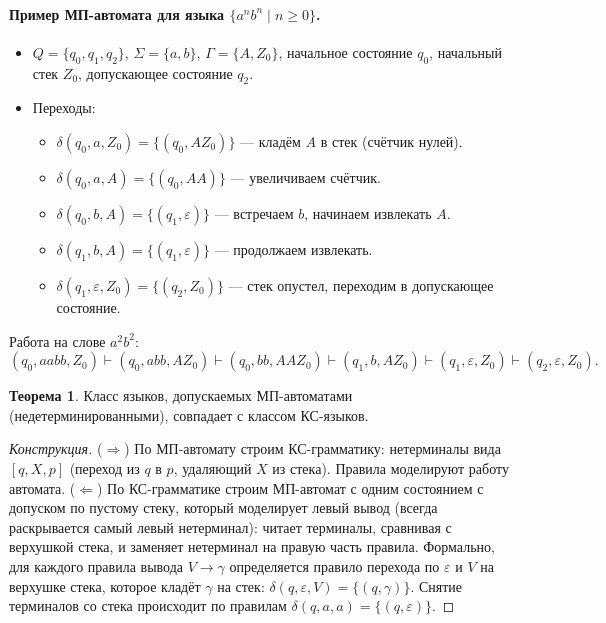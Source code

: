 \documentclass[12pt,a4paper]{article}
\theoremstyle{definition}
\newtheorem{theorem}{Теорема}[section]
\begin{document}
\paragraph{Пример МП-автомата для языка $\{a^n b^n \mid n \ge 0\}$.}
\begin{itemize}
\item $Q = \{q_0, q_1, q_2\}$, $\Sigma = \{a,b\}$, $\Gamma = \{A, Z_0\}$, начальное состояние $q_0$, начальный стек $Z_0$, допускающее состояние $q_2$.
\item Переходы:
  \begin{itemize}
  \item $\delta(q_0, a, Z_0) = \{(q_0, A Z_0)\}$ — кладём $A$ в стек (счётчик нулей).
  \item $\delta(q_0, a, A) = \{(q_0, A A)\}$ — увеличиваем счётчик.
  \item $\delta(q_0, b, A) = \{(q_1, \varepsilon)\}$ — встречаем $b$, начинаем извлекать $A$.
  \item $\delta(q_1, b, A) = \{(q_1, \varepsilon)\}$ — продолжаем извлекать.
  \item $\delta(q_1, \varepsilon, Z_0) = \{(q_2, Z_0)\}$ — стек опустел, переходим в допускающее состояние.
  \end{itemize}
\end{itemize}
Работа на слове $a^2 b^2$:
\[
(q_0, aabb, Z_0) \vdash (q_0, abb, A Z_0) \vdash (q_0, bb, A A Z_0) \vdash (q_1, b, A Z_0) \vdash (q_1, \varepsilon, Z_0) \vdash (q_2, \varepsilon, Z_0).
\]

\begin{theorem}
Класс языков, допускаемых МП-автоматами (недетерминированными), совпадает с классом КС-языков.
\end{theorem}

\begin{proof}[Конструкция]
($\Rightarrow$) По МП-автомату строим КС-грамматику: нетерминалы вида $[q,X,p]$ (переход из $q$ в $p$, удаляющий $X$ из стека). Правила моделируют работу автомата. ($\Leftarrow$) По КС-грамматике строим МП-автомат с одним состоянием с допуском по пустому стеку, который моделирует левый вывод (всегда раскрывается самый левый нетерминал): читает терминалы, сравнивая с верхушкой стека, и заменяет нетерминал на правую часть правила. Формально, для каждого правила вывода $V \to \gamma$ определяется правило перехода по $\varepsilon$ и $V$ на верхушке стека, которое кладёт $\gamma$ на стек: $\delta(q, \varepsilon, V) = \{(q, \gamma)\}$. Снятие терминалов со стека происходит по правилам $\delta(q, a, a) = \{(q, \varepsilon)\}$.
\end{proof}
\end{document}
